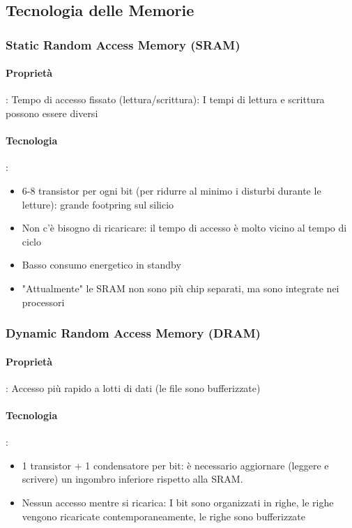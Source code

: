 \documentclass[12pt,a4paper]{article}
\begin{document}
\subsection{Tecnologia delle Memorie}
\subsubsection{Static Random Access Memory (SRAM)}
\paragraph{Proprietà}: Tempo di accesso fissato (lettura/scrittura): I tempi di lettura e scrittura possono essere diversi
\paragraph{Tecnologia}:
\begin{itemize}
\item 6-8 transistor per ogni bit (per ridurre al minimo i disturbi durante le letture): grande footpring sul silicio
\item Non c'è bisogno di ricaricare: il tempo di accesso è molto vicino al tempo di ciclo
\item Basso consumo energetico in standby
\item "Attualmente" le SRAM non sono più chip separati, ma sono integrate nei processori
\end{itemize}

\subsubsection{Dynamic Random Access Memory (DRAM)}
\paragraph{Proprietà}: Accesso più rapido a lotti di dati (le file sono bufferizzate)
\paragraph{Tecnologia}:
\begin{itemize}
\item 1 transistor + 1 condensatore per bit: è necessario aggiornare (leggere e scrivere) un ingombro inferiore rispetto alla SRAM.
\item Nessun accesso mentre si ricarica: I bit sono organizzati in righe, le righe vengono ricaricate contemporaneamente, le righe sono bufferizzate
\end{itemize}
\end{document}
